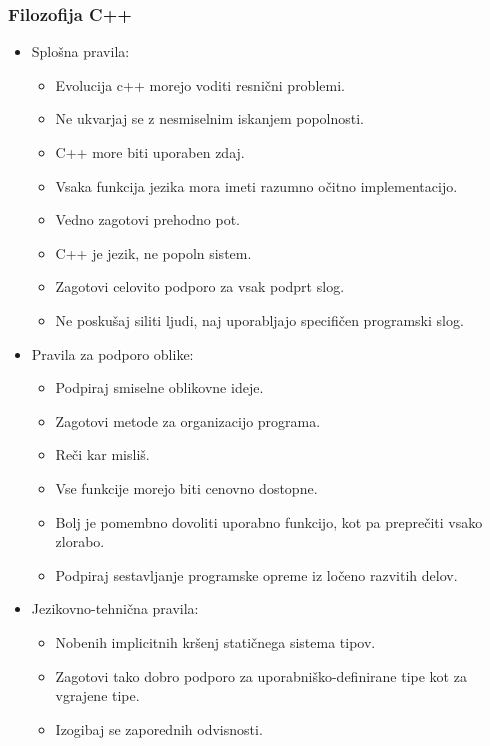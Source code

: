 \documentclass[12pt]{report}
\begin{document}
			\subsubsection{Filozofija C++}
				\begin{itemize}
					\item Splošna pravila:~\cite{cpp_evolution}
					\begin{itemize}
						\item Evolucija c++ morejo voditi resnični problemi.
						\item Ne ukvarjaj se z nesmiselnim iskanjem popolnosti.
						\item C++ more biti uporaben zdaj.
						\item Vsaka funkcija jezika mora imeti razumno očitno implementacijo.
						\item Vedno zagotovi prehodno pot.
						\item C++ je jezik, ne popoln sistem.
						\item Zagotovi celovito podporo za vsak podprt slog.
						\item Ne poskušaj siliti ljudi, naj uporabljajo specifičen programski slog.
					\end{itemize}
					\item Pravila za podporo oblike:~\cite{cpp_evolution}
					\begin{itemize}
						\item Podpiraj smiselne oblikovne ideje.
						\item Zagotovi metode za organizacijo programa.
						\item Reči kar misliš.
						\item Vse funkcije morejo biti cenovno dostopne.
						\item Bolj je pomembno dovoliti uporabno funkcijo, kot pa preprečiti vsako zlorabo.
						\item Podpiraj sestavljanje programske opreme iz ločeno razvitih delov.
					\end{itemize}
					\item Jezikovno-tehnična pravila:~\cite{cpp_evolution}
					\begin{itemize}
						\item Nobenih implicitnih kršenj statičnega sistema tipov.
						\item Zagotovi tako dobro podporo za uporabniško-definirane tipe kot za vgrajene tipe.
						\item Izogibaj se zaporednih odvisnosti.

\end{itemize}
\end{itemize}
\end{document}
